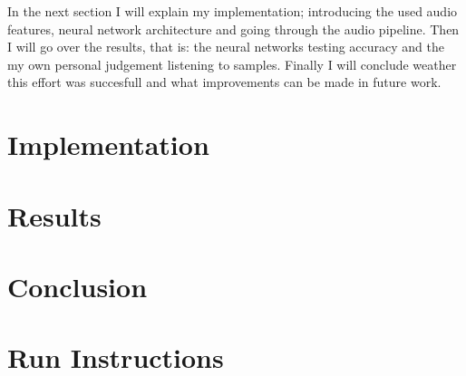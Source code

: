 \documentclass[lang=en, hanging-titles=true]{skrapport}
\begin{document}
In the next section I will explain my implementation; introducing the used audio features, neural network architecture and going through the audio pipeline. Then I will go over the results, that is: the neural networks testing accuracy and the my own personal judgement listening to samples. Finally I will conclude weather this effort was succesfull and what improvements can be made in future work.

\section{Implementation}
\section{Results}
\section{Conclusion}

\clearpage
\appendix
\section{Run Instructions}
\printbibliography
\end{document}
